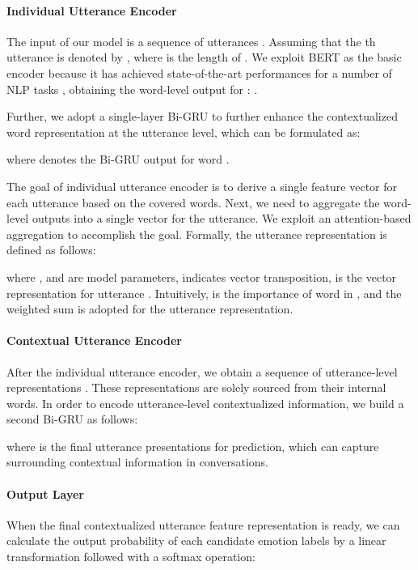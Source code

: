 \documentclass{article}
\begin{document}
\begin{CJK}{UTF8}{gbsn}
\paragraph{Individual Utterance Encoder}
The input of our model is a sequence of utterances . 
Assuming that the th utterance  is denoted by , where  is the length of .
We exploit BERT as the basic encoder because it has achieved state-of-the-art performances for a number of NLP tasks \cite{Devlin2019bert}, obtaining the word-level output for : . 

Further, we adopt a single-layer Bi-GRU to further enhance the contextualized word representation at the utterance level,
which can be formulated as: 

where  denotes the Bi-GRU output for word . 

The goal of individual utterance encoder is to derive a single feature vector for each utterance based on the covered words.
Next, we need to aggregate the word-level outputs into a single vector for the utterance.
We exploit an attention-based aggregation to accomplish the goal.
Formally, 
the utterance representation is defined as follows:

where ,  and  are model parameters,  indicates  vector transposition,  is the vector representation for utterance .
Intuitively,  is the importance of word  in ,
and the weighted sum is adopted for the utterance representation.  



\paragraph{Contextual Utterance Encoder}
After the individual utterance encoder, we obtain a sequence of utterance-level representations .
These representations are solely sourced from their internal words.
In order to encode utterance-level contextualized information,
we build a second Bi-GRU as follows:

where  is the final utterance presentations for prediction,
which can capture surrounding contextual information in conversations. 



\paragraph{Output Layer}
When the final contextualized utterance feature representation  is ready, we can calculate the output probability of each candidate emotion labels by a linear transformation followed with a softmax operation:


\end{CJK}
\end{document}
